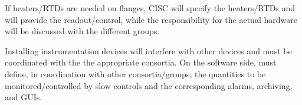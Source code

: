 If heaters/RTDs are needed on flanges, CISC will specify the heaters/RTDs and will provide the readout/control, while the responsibility for the actual hardware will be discussed with the different groups.  

Installing instrumentation devices will interfere with other devices and must be coordinated with the the appropriate consortia.  
On the software side,  must define, in coordination with other consortia/groups, the quantities to be monitored/controlled by slow controls and the corresponding alarms,
archiving, and GUIs. 


